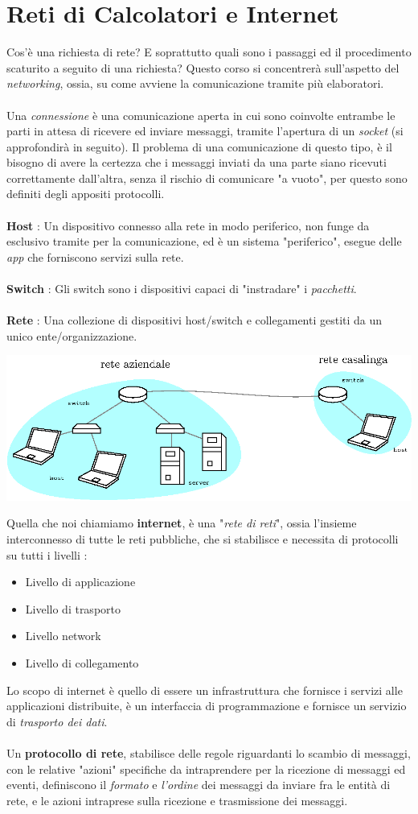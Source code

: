 \documentclass[12pt, letterpaper]{article}
\newcommand{\acc}{\\\hphantom{}\\}
\begin{document}
\section{Reti di Calcolatori e Internet}
Cos'è una richiesta di rete? E soprattutto quali sono i passaggi ed il procedimento scaturito a seguito di una richiesta? Questo corso 
si concentrerà sull'aspetto del \textit{networking}, ossia, su come avviene la comunicazione tramite più elaboratori.\acc 
Una \textit{connessione} è una comunicazione aperta in cui sono coinvolte entrambe le parti in attesa di ricevere ed inviare 
messaggi, tramite l'apertura di un \textit{socket} (si approfondirà in seguito). Il problema di una comunicazione di questo tipo, 
è il bisogno di avere la certezza che i messaggi inviati da una parte siano ricevuti correttamente dall'altra, senza il rischio di 
comunicare "a vuoto", per questo sono definiti degli appositi protocolli.\acc 
\textbf{Host} : Un dispositivo connesso alla rete in modo periferico, non funge da esclusivo tramite per la comunicazione, 
ed è un sistema "periferico", esegue delle \textit{app} che forniscono servizi sulla rete.\acc 
\textbf{Switch} : Gli switch sono i dispositivi capaci di "instradare" i \textit{pacchetti}.\acc
\textbf{Rete} : Una collezione di dispositivi host/switch e collegamenti gestiti da un unico ente/organizzazione.\begin{center}
    \includegraphics[width=1\textwidth ]{images/reteDef.eps}
\end{center}
Quella che noi chiamiamo \textbf{internet}, è una "\textit{rete di reti}", ossia l'insieme interconnesso di tutte le reti 
pubbliche, che si stabilisce e necessita di protocolli su tutti i livelli : \begin{itemize}
    \item Livello di applicazione
    \item Livello di trasporto 
    \item Livello network 
    \item Livello di collegamento
\end{itemize}
Lo scopo di internet è quello di essere un infrastruttura che fornisce i servizi alle applicazioni distribuite, è 
un interfaccia di programmazione e fornisce un servizio di \textit{trasporto dei dati}.\acc 
Un \textbf{protocollo di rete}, stabilisce delle regole riguardanti lo scambio di messaggi, con le relative "azioni" specifiche 
da intraprendere per la ricezione di messaggi ed eventi, definiscono il \textit{formato} e \textit{l'ordine} dei messaggi 
da inviare fra le entità di rete, e le azioni intraprese sulla ricezione e trasmissione dei messaggi.
\end{document}
